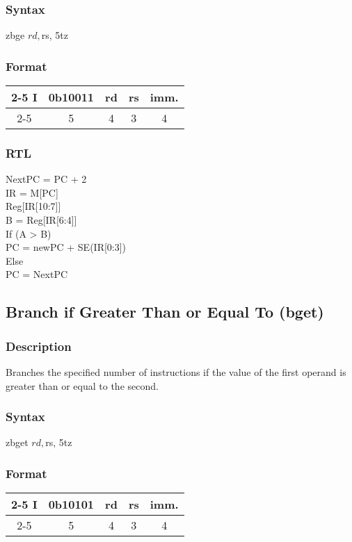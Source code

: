 \documentclass[12pt, a4paper]{report}
\begin{document}
	\subsubsection{Syntax}
	zbge    $rd, $rs, 5tz %
	\subsubsection{Format}
	\begin{center}
		{\renewcommand{\arraystretch}{1.5}
			\begin{tabular}[b]{c @{ } c | c | c | c|}
				\cline{2-5}
				I & \vline \hspace{1.5pt} 0b10011 & rd & rs & imm. \\
				\cline{2-5}
				\multicolumn{1}{}{} & \multicolumn{1}{c}{5} & \multicolumn{1}{c}{4}
				& \multicolumn{1}{c}{3} & \multicolumn{1}{c}{4}
			\end{tabular}}
	\end{center}
	\subsubsection{RTL}
	NextPC = PC + 2 \\
	IR = M[PC] \\
	Reg[IR[10:7]] \\
	B = Reg[IR[6:4]] \\
	If (A  >  B) \\
	PC = newPC + SE(IR[0:3]) \\
	Else \\
	PC = NextPC \\
	
	\subsection{Branch if Greater Than or Equal To (bget)}
	\subsubsection{Description}
	Branches the specified number of instructions if the value of the first operand is greater than or equal to the second.
	\subsubsection{Syntax}
	zbget    $rd, $rs, 5tz %
	\subsubsection{Format}
	\begin{center}
		{\renewcommand{\arraystretch}{1.5}
			\begin{tabular}[b]{c @{ } c | c | c | c|}
				\cline{2-5}
				I & \vline \hspace{1.5pt} 0b10101 & rd & rs & imm. \\
				\cline{2-5}
				\multicolumn{1}{}{} & \multicolumn{1}{c}{5} & \multicolumn{1}{c}{4}
				& \multicolumn{1}{c}{3} & \multicolumn{1}{c}{4}
			\end{tabular}}
	\end{center}
\end{document}
